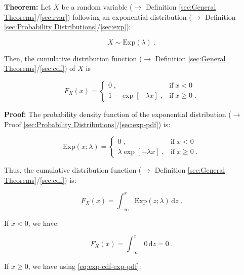 \documentclass[a4paper,12pt,twoside]{book}
\begin{document}
\textbf{Theorem:} Let $X$ be a random variable ($\rightarrow$ Definition \ref{sec:General Theorems}/\ref{sec:rvar}) following an exponential distribution ($\rightarrow$ Definition \ref{sec:Probability Distributions}/\ref{sec:exp}):

\begin{equation} \label{eq:exp-cdf-exp}
X \sim \mathrm{Exp}(\lambda) \; .
\end{equation}

Then, the cumulative distribution function ($\rightarrow$ Definition \ref{sec:General Theorems}/\ref{sec:cdf}) of $X$ is

\begin{equation} \label{eq:exp-cdf-exp-cdf}
F_X(x) = \left\{
\begin{array}{rl}
0 \; , & \text{if} \; x < 0 \\
1 - \exp[-\lambda x] \; , & \text{if} \; x \geq 0 \; .
\end{array}
\right.
\end{equation}


\vspace{1em}
\textbf{Proof:}  The probability density function of the exponential distribution ($\rightarrow$ Proof \ref{sec:Probability Distributions}/\ref{sec:exp-pdf}) is:

\begin{equation} \label{eq:exp-cdf-exp-pdf}
\mathrm{Exp}(x; \lambda) = \left\{
\begin{array}{rl}
0 \; , & \text{if} \; x < 0 \\
\lambda \exp[-\lambda x] \; , & \text{if} \; x \geq 0 \; .
\end{array}
\right.
\end{equation}

Thus, the cumulative distribution function ($\rightarrow$ Definition \ref{sec:General Theorems}/\ref{sec:cdf}) is:

\begin{equation} \label{eq:exp-cdf-exp-cdf-s1}
F_X(x) = \int_{-\infty}^{x} \mathrm{Exp}(z; \lambda) \, \mathrm{d}z \; .
\end{equation}

If $x < 0$, we have:

\begin{equation} \label{eq:exp-cdf-exp-cdf-s2a}
F_X(x) = \int_{-\infty}^{x} 0 \, \mathrm{d}z = 0 \; .
\end{equation}

If $x \geq 0$, we have using \eqref{eq:exp-cdf-exp-pdf}:
\end{document}
